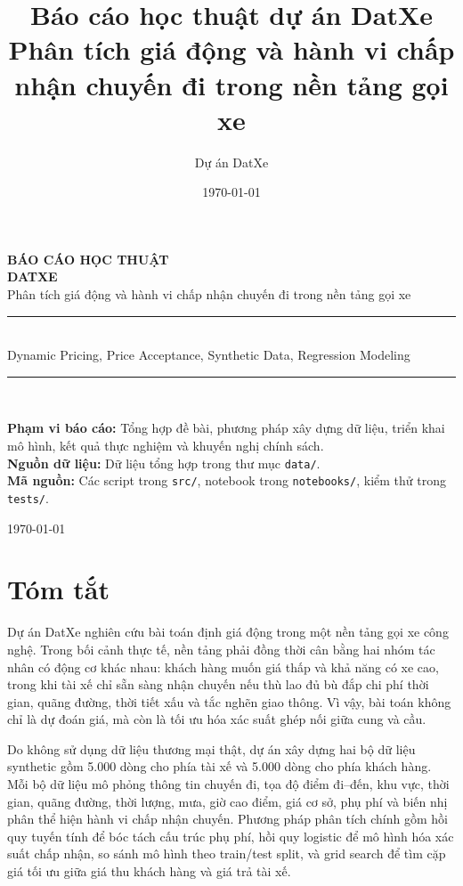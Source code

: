 \documentclass[12pt,a4paper]{report}
\title{\textbf{Báo cáo học thuật dự án DatXe}\\[0.4cm]
\large Phân tích giá động và hành vi chấp nhận chuyến đi trong nền tảng gọi xe}
\author{Dự án DatXe}
\date{\today}
\begin{document}
\begin{titlepage}
    \centering
    \vspace*{1.5cm}
    {\Large \textbf{BÁO CÁO HỌC THUẬT}}\\[1.0cm]
    {\Huge \textbf{DATXE}}\\[0.35cm]
    {\LARGE Phân tích giá động và hành vi chấp nhận chuyến đi trong nền tảng gọi xe}\\[1.5cm]
    \rule{0.78\textwidth}{0.5pt}\\[0.6cm]
    {\large Dynamic Pricing, Price Acceptance, Synthetic Data, Regression Modeling}\\[0.6cm]
    \rule{0.78\textwidth}{0.5pt}\\[2.0cm]
    \begin{flushleft}
        \large
        \textbf{Phạm vi báo cáo:} Tổng hợp đề bài, phương pháp xây dựng dữ liệu, triển khai mô hình, kết quả thực nghiệm và khuyến nghị chính sách.\\[0.3cm]
        \textbf{Nguồn dữ liệu:} Dữ liệu tổng hợp trong thư mục \texttt{data/}.\\[0.3cm]
        \textbf{Mã nguồn:} Các script trong \texttt{src/}, notebook trong \texttt{notebooks/}, kiểm thử trong \texttt{tests/}.
    \end{flushleft}
    \vfill
    {\large \today}
\end{titlepage}

\clearpage
{}
\tableofcontents
\clearpage
{}

\chapter*{Tóm tắt}

Dự án DatXe nghiên cứu bài toán định giá động trong một nền tảng gọi xe công nghệ. Trong bối cảnh thực tế, nền tảng phải đồng thời cân bằng hai nhóm tác nhân có động cơ khác nhau: khách hàng muốn giá thấp và khả năng có xe cao, trong khi tài xế chỉ sẵn sàng nhận chuyến nếu thù lao đủ bù đắp chi phí thời gian, quãng đường, thời tiết xấu và tắc nghẽn giao thông. Vì vậy, bài toán không chỉ là dự đoán giá, mà còn là tối ưu hóa xác suất ghép nối giữa cung và cầu.

Do không sử dụng dữ liệu thương mại thật, dự án xây dựng hai bộ dữ liệu synthetic gồm 5.000 dòng cho phía tài xế và 5.000 dòng cho phía khách hàng. Mỗi bộ dữ liệu mô phỏng thông tin chuyến đi, tọa độ điểm đi--đến, khu vực, thời gian, quãng đường, thời lượng, mưa, giờ cao điểm, giá cơ sở, phụ phí và biến nhị phân thể hiện hành vi chấp nhận chuyến. Phương pháp phân tích chính gồm hồi quy tuyến tính để bóc tách cấu trúc phụ phí, hồi quy logistic để mô hình hóa xác suất chấp nhận, so sánh mô hình theo train/test split, và grid search để tìm cặp giá tối ưu giữa giá thu khách hàng và giá trả tài xế.
\end{document}
